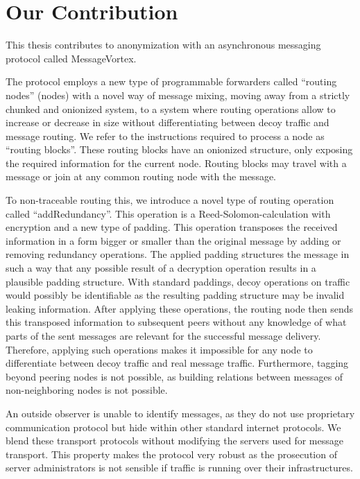 



\chapter{Our Contribution}
This thesis contributes to anonymization with an asynchronous messaging protocol called MessageVortex.

The protocol employs a new type of programmable forwarders called ``routing nodes'' (nodes) with a novel way of message mixing, moving away from a strictly chunked and onionized system, to a system where routing operations allow to increase or decrease in size without differentiating between decoy traffic and message routing. We refer to the instructions required to process a node as ``routing blocks''. These routing blocks have an onionized structure, only exposing the required information for the current node. Routing blocks may travel with a message or join at any common routing node with the message.

To non-traceable routing this, we introduce a novel type of routing operation called ``addRedundancy''. This operation is a Reed-Solomon-calculation with encryption and a new type of padding. This operation transposes the received information in a form bigger or smaller than the original message by adding or removing redundancy operations. The applied padding structures the message in such a way that any possible result of a decryption operation results in a plausible padding structure. With standard paddings, decoy operations on traffic would possibly be identifiable as the resulting padding structure may be invalid leaking information. After applying these operations, the routing node then sends this transposed information to subsequent peers without any knowledge of what parts of the sent messages are relevant for the successful message delivery. Therefore, applying such operations makes it impossible for any node to differentiate between decoy traffic and real message traffic. Furthermore, tagging beyond peering nodes is not possible, as building relations between messages of non-neighboring nodes is not possible.

An outside observer is unable to identify messages, as they do not use proprietary communication protocol but hide within other standard internet protocols. We blend these transport protocols without modifying the servers used for message transport. This property makes the protocol very robust as the prosecution of server administrators is not sensible if traffic is running over their infrastructures. 

